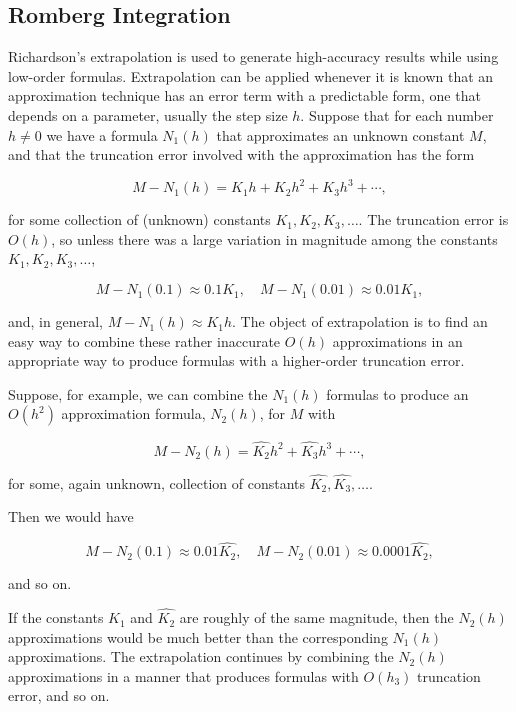 \documentclass[preprint,12pt]{elsarticle}
\begin{document}
\subsection{Romberg Integration}
\label{SS:2.2}

Richardson’s extrapolation is used to generate high-accuracy results while using low-order formulas. Extrapolation can be applied whenever it is known that an approximation technique has an error term with a predictable form, one that depends on a parameter, usually the step size $h$. Suppose that for each number $h\neq 0$ we have a formula $N_1(h)$ that approximates an
unknown constant $M$, and that the truncation error involved with the approximation has the form

\begin{equation}
    M-N_{1}(h)=K_{1}h+K_{2}h^{2}+K_{3}h^{3}+\cdots,
\end{equation}

for some collection of (unknown) constants $K_1,K_2,K_3,\dots$. The truncation error is $O(h)$, so unless there was a large variation in magnitude among the constants $K_1,K_2,K_3,\dots$,

\begin{equation}
    M-N_{1}(0.1) \approx 0.1K_1,\quad M-N_{1}(0.01) \approx 0.01K_1 ,
\end{equation}

and, in general, $M-N_{1}(h)\approx K_{1}h$. The object of extrapolation is to find an easy way to combine these rather inaccurate $O(h)$ approximations in an appropriate way to produce formulas with a higher-order truncation error.

Suppose, for example, we can combine the $N_{1}(h)$ formulas to produce an $O(h^2)$ approximation formula, $N_{2}(h)$, for $M$ with

\begin{equation}
    M-N_{2}(h)=\hat{K_2}h^2 + \hat{K_3}h^3 +\cdots,
\end{equation}

for some, again unknown, collection of constants $\hat{K_2},\hat{K_3},\dots$.

Then we would have

\begin{equation}
    M-N_{2}(0.1)\approx 0.01\hat{K_2},\quad M-N_{2}(0.01)\approx 0.0001\hat{K_2},
\end{equation}

and so on.

If the constants $K_1$ and $\hat{K_2}$ are roughly of the same magnitude, then the $N_{2}(h)$ approximations would be much better than the corresponding $N_{1}(h)$ approximations. The extrapolation continues by combining the $N_{2}(h)$ approximations in a manner that produces formulas with $O(h_3)$ truncation error, and so on.
\end{document}
